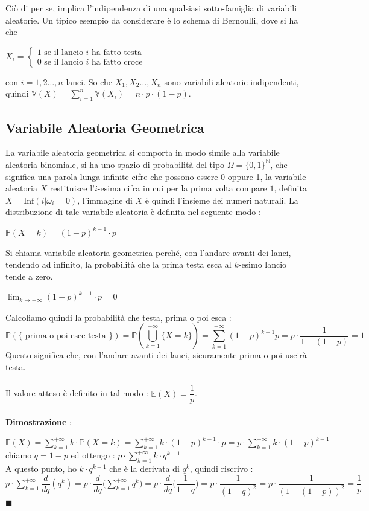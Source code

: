 \documentclass[12pt, letterpaper]{article}
\newcommand{\N}{{\mathbb N}}
\newcommand{\E}{{\mathbb E}}
\newcommand{\V}{{\mathbb V}}
\newcommand{\acc}{\\\hphantom{}\\}
\newcommand{\Prob}{{\mathbb P}}
\begin{document}
Ciò di per se, implica l'indipendenza di una qualsiasi sotto-famiglia di variabili aleatorie. Un tipico esempio 
da considerare è lo schema di Bernoulli, dove si ha che \begin{center}\(X_i=\begin{cases}
    1 \text{ se il lancio }i\text{ ha fatto testa}\\ 0 \text{ se il lancio }i\text{ ha fatto croce}
\end{cases}\)\end{center}
con \(i=1,2\dots,n\) lanci. So che \(X_1,X_2\dots,X_n\) sono variabili aleatorie indipendenti, quindi 
\(\V(X)=\displaystyle\sum _{i=1}^n\V(X_i)=n\cdot p\cdot (1-p)\).
\subsection{Variabile Aleatoria Geometrica}
La variabile aleatoria geometrica si comporta in modo simile alla variabile aleatoria binomiale, si ha uno 
spazio di probabilità del tipo \(\Omega=\{0,1\}^{\N}\), che significa una parola lunga infinite cifre che possono 
essere 0 oppure 1, la variabile aleatoria \(X\) restituisce l'\(i\)-esima cifra in cui per la prima 
volta compare \(1\), definita \(X=\text{Inf}(i|\omega_i=0)\), l'immagine di \(X\) è quindi l'insieme dei 
numeri naturali. La distribuzione di tale variabile aleatoria è definita nel seguente modo : \begin{center}
    \(\Prob(X=k)=(1-p)^{k-1}\cdot p\)
\end{center}
Si chiama variabile aleatoria geometrica perché, con l'andare avanti dei lanci, tendendo ad infinito, la 
probabilità che la prima testa esca al \(k\)-esimo lancio tende a zero. \begin{center}
    \(\displaystyle\lim_{k\rightarrow+\infty}(1-p)^{k-1}\cdot p=0\)\end{center}
    Calcoliamo quindi la probabilità che testa, prima o poi esca : \begin{equation}
        \Prob(\{\text{ prima o poi esce testa }\})=\Prob(\bigcup^{+\infty}_{k=1}\{X=k\})=\sum^{+\infty}_{k=1}
        (1-p)^{k-1}p=p\cdot\dfrac{1}{1-(1-p)}=1
    \end{equation}
    Questo significa che, con l'andare avanti dei lanci, sicuramente prima o poi 
    uscirà testa.\acc 
    Il valore atteso è definito in tal modo : \(\E(X)=\dfrac{1}{p}\).\acc
    \textbf{Dimostrazione }:
    \begin{center}
        \(
        \E(X)=\displaystyle\sum_{k=1}^{+\infty}k\cdot\Prob(X=k) =\sum_{k=1}^{+\infty} k\cdot (1-p)^{k-1}\cdot p  
        =p\cdot \sum_{k=1}^{+\infty} k\cdot (1-p)^{k-1}
        \)\\ chiamo \(q=1-p\) ed ottengo : \(\displaystyle p\cdot \sum_{k=1}^{+\infty} k\cdot q^{k-1}\)\\
        A questo punto, ho \(k\cdot q^{k-1}\) che è la derivata di \(q^k\), quindi riscrivo : \\\(
            \displaystyle p\cdot \sum_{k=1}^{+\infty} \dfrac{d}{dq}(q^k)=p\cdot \dfrac{d}{dq}\Big(\sum_{k=1}^{+\infty}q^k\Big)
        =p\cdot \dfrac{d}{dq}\Big( \dfrac{1}{1-q}  \Big)=p\cdot\dfrac{1}{(1-q)^2}=p\cdot\dfrac{1}{(1-(1-p))^2}=\dfrac{1}{p}\)
     \(\blacksquare\)\end{center}
\end{document}
